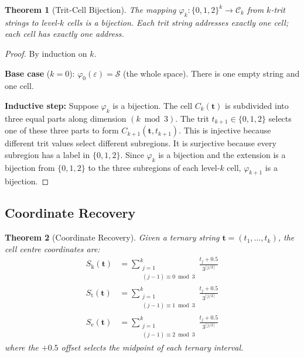 \documentclass[11pt,a4paper]{article}
\newtheorem{theorem}{Theorem}[section]
\theoremstyle{definition}
\theoremstyle{remark}
\newcommand{\Sk}{S_{\mathrm{k}}}
\newcommand{\St}{S_{\mathrm{t}}}
\newcommand{\Se}{S_{\mathrm{e}}}
\newcommand{\Sspace}{\mathcal{S}}
\begin{document}
\begin{theorem}[Trit-Cell Bijection]
\label{thm:bijection}
The mapping $\varphi_k: \{0,1,2\}^k \to \mathcal{C}_k$ from $k$-trit strings to level-$k$ cells is a bijection. Each trit string addresses exactly one cell; each cell has exactly one address.
\end{theorem}

\begin{proof}
By induction on $k$.

\textbf{Base case} ($k = 0$): $\varphi_0(\varepsilon) = \Sspace$ (the whole space). There is one empty string and one cell.

\textbf{Inductive step:} Suppose $\varphi_k$ is a bijection. The cell $C_k(\mathbf{t})$ is subdivided into three equal parts along dimension $(k \bmod 3)$. The trit $t_{k+1} \in \{0, 1, 2\}$ selects one of these three parts to form $C_{k+1}(\mathbf{t}, t_{k+1})$. This is injective because different trit values select different subregions. It is surjective because every subregion has a label in $\{0, 1, 2\}$. Since $\varphi_k$ is a bijection and the extension is a bijection from $\{0,1,2\}$ to the three subregions of each level-$k$ cell, $\varphi_{k+1}$ is a bijection.
\end{proof}

\subsection{Coordinate Recovery}

\begin{theorem}[Coordinate Recovery]
\label{thm:recovery}
Given a ternary string $\mathbf{t} = (t_1, \ldots, t_k)$, the cell centre coordinates are:
\begin{align}
\Sk(\mathbf{t}) &= \sum_{\substack{j=1 \\ (j-1) \equiv 0 \bmod 3}}^{k} \frac{t_j + 0.5}{3^{\lceil j/3 \rceil}} \label{eq:recovery_sk} \\
\St(\mathbf{t}) &= \sum_{\substack{j=1 \\ (j-1) \equiv 1 \bmod 3}}^{k} \frac{t_j + 0.5}{3^{\lceil j/3 \rceil}} \label{eq:recovery_st} \\
\Se(\mathbf{t}) &= \sum_{\substack{j=1 \\ (j-1) \equiv 2 \bmod 3}}^{k} \frac{t_j + 0.5}{3^{\lceil j/3 \rceil}} \label{eq:recovery_se}
\end{align}
where the $+0.5$ offset selects the midpoint of each ternary interval.
\end{theorem}
\end{document}

